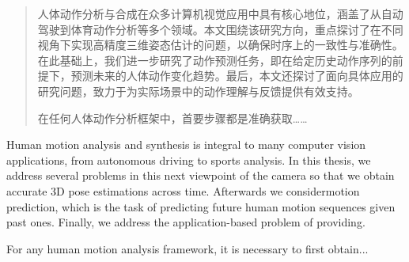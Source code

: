 \begin{abstract}
  人体动作分析与合成在众多计算机视觉应用中具有核心地位，涵盖了从自动驾驶到体育动作分析等多个领域。本文围绕该研究方向，重点探讨了在不同视角下实现高精度三维姿态估计的问题，以确保时序上的一致性与准确性。在此基础上，我们进一步研究了动作预测任务，即在给定历史动作序列的前提下，预测未来的人体动作变化趋势。最后，本文还探讨了面向具体应用的研究问题，致力于为实际场景中的动作理解与反馈提供有效支持。
  
  在任何人体动作分析框架中，首要步骤都是准确获取……
\end{abstract}


\begin{abstractEn}
  Human motion analysis and synthesis is integral to many computer vision applications, from autonomous driving to sports analysis. In this thesis, we address several problems in this next viewpoint of the camera so that we obtain accurate 3D pose estimations across time. Afterwards we considermotion prediction, which is the task of predicting future human motion sequences given past ones. Finally, we address the application-based problem of providing. 
  
  For any human motion analysis framework, it is necessary to first obtain...
\end{abstractEn}
